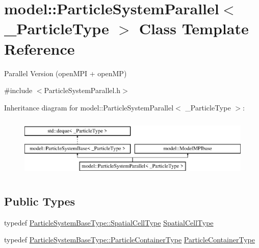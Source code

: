 \hypertarget{classmodel_1_1_particle_system_parallel}{}\section{model\+:\+:Particle\+System\+Parallel$<$ \+\_\+\+Particle\+Type $>$ Class Template Reference}
\label{classmodel_1_1_particle_system_parallel}


Parallel Version (open\+M\+P\+I + open\+M\+P)  




{\ttfamily \#include $<$Particle\+System\+Parallel.\+h$>$}

Inheritance diagram for model\+:\+:Particle\+System\+Parallel$<$ \+\_\+\+Particle\+Type $>$\+:\begin{figure}[H]
\begin{center}
\leavevmode
\includegraphics[height=2.926829cm]{classmodel_1_1_particle_system_parallel}
\end{center}
\end{figure}
\subsection*{Public Types}
\begin{DoxyCompactItemize}
\item 
typedef \hyperlink{classmodel_1_1_particle_system_base_a8de0382d851a8968d757f91bad3a408e}{Particle\+System\+Base\+Type\+::\+Spatial\+Cell\+Type} \hyperlink{classmodel_1_1_particle_system_parallel_a90da37866f5909badb80f473271e8a77}{Spatial\+Cell\+Type}
\item 
typedef \hyperlink{classmodel_1_1_particle_system_base_ac95d9a819d1da5e86f726494bf6df504}{Particle\+System\+Base\+Type\+::\+Particle\+Container\+Type} \hyperlink{classmodel_1_1_particle_system_parallel_a9e6440f201143091c993f4729a8b512e}{Particle\+Container\+Type}
\end{DoxyCompactItemize}
